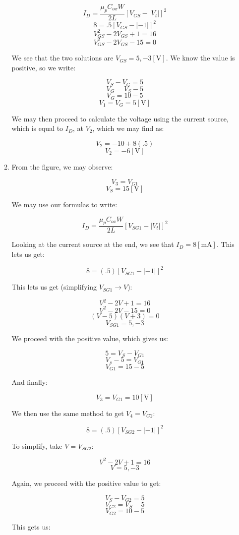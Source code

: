 \begin{enumerate}
\begin{enumerate}
        $$I_D=\frac{\mu_pC_{ox}W}{2L}[V_{GS}-|V_{t}|]^2$$
        $$8=.5[V_{GS}-|-1|]^2$$
        $$V_{GS}^2-2V_{GS}+1=16$$
        $$V_{GS}^2-2V_{GS}-15=0$$

        We see that the two solutions are $V_{GS}=5,-3[\si{\volt}]$. We know the value is positive, so we write:

        $$V_S-V_G=5$$
        $$V_G=V_S-5$$
        $$V_G=10-5$$
        $$\boxed{V_1=V_G=5[\si{\volt}]}$$

        We may then proceed to calculate the voltage using the current source, which is equal to $I_D$, at $V_2$, which we may find as:

        $$V_2=-10+8(.5)$$
        $$\boxed{V_2=-6[\si{\volt}]}$$

      \item From the figure, we may observe:

        $$V_3=V_{G1}$$
        $$V_S=15[\si{\volt}]$$

        We may use our formulas to write:

        $$I_D=\frac{\mu_p C_{ox}W}{2L}[V_{SG1}-|V_t|]^2$$

        Looking at the current source at the end, we see that $I_D=8[\si{\milli\ampere}]$. This lets us get:

        $$8=(.5)[V_{SG1}-|-1|]^2$$

        This lets us get (simplifying $V_{SG1}\to V$):

        $$V^2-2V+1=16$$
        $$V^2-2V-15=0$$
        $$(V-5)(V+3)=0$$
        $$V_{SG1}=5,-3$$

        We proceed with the positive value, which gives us:

        $$5=V_S-V_{G1}$$
        $$V_s-5=V_{G1}$$
        $$V_{G1}=15-5$$

        And finally:

        $$\boxed{V_3=V_{G1}=10[\si{\volt}]}$$

        We then use the same method to get $V_4=V_{G2}$:

        $$8=(.5)[V_{SG2}-|-1|]^2$$

        To simplify, take $V=V_{SG2}$:

        $$V^2-2V+1=16$$
        $$V=5,-3$$

        Again, we proceed with the positive value to get:

        $$V_{S}-V_{G2}=5$$
        $$V_{G2}=V_S-5$$
        $$V_{G2}=10-5$$

        This gets us:


\end{enumerate}
\end{enumerate}
